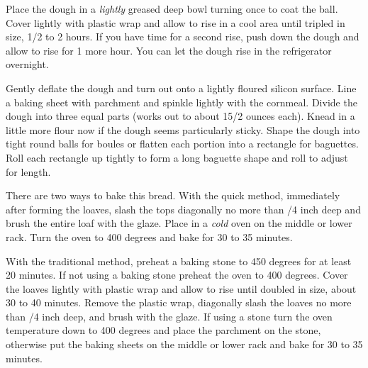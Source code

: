 \begin{IngredientsAndSteps}
{        Place the dough in a \textit{lightly} greased deep bowl turning once
        to coat the ball. Cover lightly with plastic wrap and allow to rise
        in a cool area until tripled in size, 1/2 to 2 hours. If you
        have time for a second rise, push down the dough and allow to rise
        for 1 more hour. You can let the dough rise in the refrigerator overnight.

        Gently deflate the dough and turn out onto a lightly floured silicon surface.
        Line a baking sheet with parchment and spinkle lightly with the cornmeal.
        Divide the dough into three equal parts (works out to about 15/2
        ounces each). Knead in a little more flour now if the dough seems particularly
        sticky. Shape the dough into tight round balls for boules or flatten each
        portion into a rectangle for baguettes. Roll each rectangle up tightly to
        form a long baguette shape and roll to adjust for length.
    }
\end{IngredientsAndSteps}

\begin{IngredientsAndSteps}
    \ListIngredientsAndSteps
    {}
    {
        There are two ways to bake this bread. With the quick method, immediately after forming
        the loaves, slash the tops diagonally no more than /4 inch deep and brush
        the entire loaf with the glaze. Place in a \textit{cold} oven on the middle or lower rack.
        Turn the oven to 400 degrees and bake for 30 to 35 minutes.

        With the traditional method, preheat a baking stone to 450 degrees for at least 20 minutes.
        If not using a baking stone preheat the oven to 400 degrees. Cover the loaves lightly with
        plastic wrap and allow to rise until doubled in size, about 30 to 40 minutes. Remove the
        plastic wrap, diagonally slash the loaves no more than /4 inch deep, and brush
        with the glaze. If using a stone turn the oven temperature down to 400 degrees and place
        the parchment on the stone, otherwise put the baking sheets on the middle or lower rack and
        bake for 30 to 35 minutes.
    }
\end{IngredientsAndSteps}

%
%
%
%

\newpage



